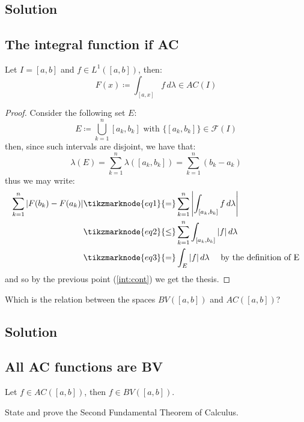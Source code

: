 \subsection*{Solution}

\subsection{The integral function if AC} \label{intfunc:AC}
Let $I=[a,b]$ and $f\in L^1([a,b])$, then:
\[
    F(x) \coloneqq \int_{[a,x]} f \, d\lambda \in AC(I)    
\]

\begin{proof}
    Consider the following set $E$:
    \[
        E \coloneqq \bigcup_{k=1}^n [a_k, b_k] \text{ with } \{[a_k , b_k]\} \in \mathscr{F}(I)
    \]
    then, since such intervals are disjoint, we have that:
    \[
        \lambda(E) = \sum_{k=1}^n \lambda([a_k, b_k]) = \sum_{k=1}^n (b_k-a_k)
    \]
    thus we may write:
    \begin{align*}
        \sum_{k=1}^n |F(b_k) - F(a_k)| & \tikzmarknode{eq1}{=} \sum_{k=1}^n \left| \int_{[a_k, b_k]} f \, d\lambda \right| \\
        & \tikzmarknode{eq2}{\leq} \sum_{k=1}^n \int_{[a_k, b_k]} |f| \, d\lambda \\
        & \tikzmarknode{eq3}{=} \int_E |f| \, d\lambda \quad \text{ by the definition of E}
    \end{align*}
    and so by the previous point (\ref{int:cont}) we get the thesis.
\end{proof}


\question
Which is the relation between the spaces $BV ([a, b])$ and $AC([a, b])$?

\subsection*{Solution}

\subsection{All AC functions are BV}\label{ac:bv}
Let $f \in AC([a, b])$, then $f\in BV([a, b])$.


\question
State and prove the Second Fundamental Theorem of Calculus.

